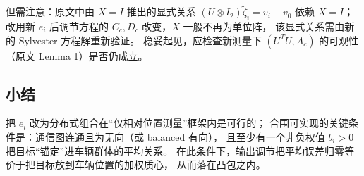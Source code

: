 但需注意：原文中由 $X=I$ 推出的显式关系
$(U\otimes I_2)\tilde\zeta_i=v_i-v_0$ 依赖 $X=I$；
改用新 $e_i$ 后调节方程的 $C_c,D_c$ 改变，$X$ 一般不再为单位阵，
该显式关系需由新的 Sylvester 方程解重新验证。
稳妥起见，应检查新测量下 $(U^TU,A_c)$ 的可观性（原文 Lemma 1）是否仍成立。

\subsection{小结}

把 $e_i$ 改为分布式组合在“仅相对位置测量”框架内是可行的；
合围可实现的关键条件是：通信图连通且为无向（或 balanced 有向），
且至少有一个非负权值 $b_i>0$ 把目标“锚定”进车辆群体的平均关系。
在此条件下，输出调节把平均误差归零等价于把目标放到车辆位置的加权质心，
从而落在凸包之内。
